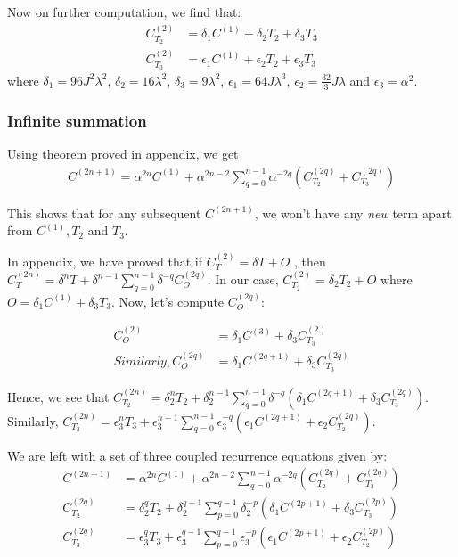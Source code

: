 \documentclass[11pt,a4paper]{article}
\begin{document}
Now on further computation, we find that:
\begin{align}
C^{(2)}_{T_2}&= \delta_1 C^{(1)} + \delta_2 T_2 + \delta_3 T_3 \\
C^{(2)}_{T_3}&= \epsilon_1 C^{(1)} + \epsilon_2 T_2 + \epsilon_3 T_3 
\end{align}
where $\delta_1= 96 J^2 \lambda^2$, $\delta_2= 16 \lambda^2$, $\delta_3= 9 \lambda^2$, $\epsilon_1= 64 J \lambda^3$, $\epsilon_2= \frac{32}{3} J \lambda$ and $\epsilon_3= \alpha^2$.



\subsubsection{Infinite summation}

Using theorem proved in appendix, we get
\begin{align*}
C^{(2n+1)}= \alpha^{2n} C^{(1)} +\alpha^{2n-2} \sum_{q=0}^{n-1} \alpha^{-2q} (C^{(2q)}_{T_2} + C^{(2q)}_{T_3}  )
\end{align*}



This shows that for any subsequent $C^{(2n+1)}$, we won't have any \textit{new} term apart from $C^{(1)},T_2$ and $T_3$. 

In appendix, we have proved that if $C^{(2)}_T=  \delta T + O$ , then $C^{(2n)}_T= \delta^{n} T +  \delta^{n-1} \sum_{q=0}^{n-1} \delta^{-q} C^{(2q)}_O  $. In our case,  $C^{(2)}_{T_2}=  \delta_2 T_2 + O $ where $O=\delta_1 C^{(1)} + \delta_3 T_3$. Now, let's compute $C^{(2q)}_O$:

\begin{align*}
C^{(2)}_O&=\delta_1 C^{(3)} + \delta_3  C^{(2)}_{T_3} \\
Similarly, C^{(2q)}_O&=\delta_1 C^{(2q+1)} + \delta_3  C^{(2q)}_{T_3} 
\end{align*}

Hence, we see that $C^{(2n)}_{T_2}= \delta_2^{n} T_2 +  \delta_2^{n-1} \sum_{q=0}^{n-1} \delta^{-q} (\delta_1 C^{(2q+1)} + \delta_3  C^{(2q)}_{T_3})  $. Similarly, $C^{(2n)}_{T_3}= \epsilon_3^{n} T_3 +  \epsilon_3^{n-1} \sum_{q=0}^{n-1}\epsilon_3^{-q} (\epsilon_1 C^{(2q+1)} + \epsilon_2  C^{(2q)}_{T_2})  $. 

We are left with a set of three coupled recurrence equations given by:
\begin{equation}
\boxed{
\begin{aligned}
C^{(2n+1)}&= \alpha^{2n} C^{(1)} +\alpha^{2n-2} \sum_{q=0}^{n-1} \alpha^{-2q} (C^{(2q)}_{T_2} + C^{(2q)}_{T_3}  ) \\
C^{(2q)}_{T_2} &= \delta^{q}_2 T_2 +  \delta_2^{q-1} \sum_{p=0}^{q-1} \delta_2^{-p}   (\delta_1 C^{(2p+1)} + \delta_3  C^{(2p)}_{T_3})\\
C^{(2q)}_{T_3} &= \epsilon_3^{q} T_3 +  \epsilon_3^{q-1} \sum_{p=0}^{q-1}\epsilon_3^{-p} (\epsilon_1 C^{(2p+1)} + \epsilon_2  C^{(2p)}_{T_2}) 
\end{aligned}
}
\end{equation}
\end{document}
